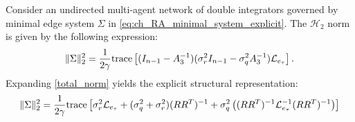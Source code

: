 \begin{theo}\label{theoH2}
\leavevmode\par\noindent
Consider an undirected multi-agent network of double integrators governed by minimal edge system $\Sigma$ in \eqref{eq:ch_RA_minimal_system_explicit}. The $\mathcal{H}_2$ norm is given by the following expression:
\begin{equation}\label{total_norm}
	\|\Sigma\|_2^2 = \frac{1}{2\gamma} \text{trace}\left[ (I_{n-1} - A_3^{-1}) (\sigma_r^2 I_{n-1} - \sigma_q^2 A_3^{-1}) \mathcal{L}_{e_{\tau}} \right].
\end{equation}
Expanding \eqref{total_norm} yields the explicit structural representation:
\begin{equation}\label{total_norm_expanded}
	\|\Sigma\|_2^2 = \frac{1}{2\gamma} \text{trace}\left[ \sigma_r^2 \mathcal{L}_{e_{\tau}} + (\sigma_q^2 + \sigma_r^2) (RR^T)^{-1} + \sigma_q^2 \left( (RR^T)^{-1} \mathcal{L}_{e_{\tau}}^{-1} (RR^T)^{-1} \right) \right]
\end{equation}
\end{theo}

